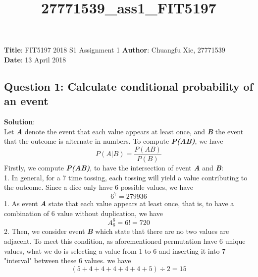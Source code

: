 \documentclass[11pt]{article}
\title{27771539\_ass1\_FIT5197}
\begin{document}
    
    
    \maketitle
    
    

    
    \textbf{Title}: FIT5197 2018 S1 Assignment 1 \textbf{Author}: Chuangfu
Xie, 27771539\\
\textbf{Date}: 13 April 2018

    \subsection{Question 1: Calculate conditional probability of an
event}\label{question-1-calculate-conditional-probability-of-an-event}

\textbf{Solution}:\\
Let \textbf{\emph{A}} denote the event that each value appears at least
once, and \textbf{\emph{B}} the event that the outcome is alternate in
numbers. To compute \textbf{\emph{P(A\textbar{}B)}}, we have\\
\[P(A|B)=\frac { P(AB) }{ P(B) }\] Firstly, we compute
\textbf{\emph{P(AB)}}, to have the intersection of event
\textbf{\emph{A}} and \textbf{\emph{B}}:\\
1. In general, for a 7 time tossing, each tossing will yield a value
contributing to the outcome. Since a dice only have 6 possible values,
we have \[{ 6 }^{ 7 }=279936\] 1. As event \textbf{\emph{A}} state that
each value appears at least once, that is, to have a combination of 6
value without duplication, we have \[{ A }_{ 6 }^{ 6 }=6!=720\] 2. Then,
we consider event \textbf{\emph{B}} which state that there are no two
values are adjacent. To meet this condition, as aforementioned
permutation have 6 unique values, what we do is selecting a value from 1
to 6 and inserting it into 7 "interval" between these 6 values. we have
\[(5+4+4+4+4+4+5)\div2=15\]
\end{document}
